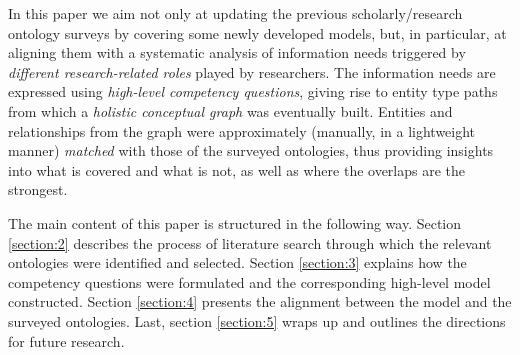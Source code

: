 In this paper we aim not only at updating the previous scholarly/research ontology surveys by covering some newly developed models, but, in particular, at  aligning them with a systematic analysis of information needs triggered by \emph{different research-related roles} played by researchers.
The information needs are expressed using \emph{high-level competency questions}, giving rise to entity type paths from which a \emph{holistic conceptual graph} was eventually built.
Entities and relationships from the graph were approximately (manually, in a lightweight manner) \emph{matched} with those of the surveyed ontologies, thus providing insights into what is covered and what is not, as well as where the overlaps are the strongest.

The main content of this paper is structured in the following way. Section \ref{section:2} describes the process of literature search through which the relevant ontologies were identified and selected. Section \ref{section:3} explains how the competency questions were formulated and  the corresponding high-level model constructed. Section \ref{section:4} presents the alignment between the model and the surveyed ontologies. Last, section  \ref{section:5} wraps up and outlines the directions for future research.
